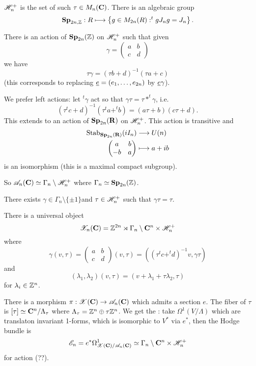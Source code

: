 \begin{definition}
$\mathscr H_n^{+}$ is the set of such $\tau\in M_n(\mathbf{C})$. There is an algebraic group
\[
\Sp_{2n,\Z}:R \mapsto \left\{ g\in M_{2n}(R) : ^{t}gJ_ng = J_n \right\}
.\]
\end{definition}
There is an action of $\mathbf{Sp}_{2n}(\mathbb Z)$ on $\mathscr H_n^{+}$ such that given
\[
\gamma =
\begin{pmatrix} a & b \\ c & d
\end{pmatrix}
\]
we have
\[
\tau \gamma = (\tau b + d)^{-1}(\tau a + c)
\]
(this corresponds to replacing $\underline{e}=(e_1,\dots,e_{2n})$ by $\underline{e}\gamma$).

We prefer left actions: let $^{t}\gamma$ act so that $\gamma\tau = \tau*^{t}\gamma$, i.e.
\[
(\tau^{t}c + d)^{-1}(\tau^{t}a+^{t}b) = (a\tau + b)(c\tau + d)
.\]
This extends to an action of $\mathbf{Sp}_{2n}(\mathbf{R})$ on $\mathscr H_n^{+}$. This action is transitive and
\begin{align*}
\operatorname{Stab}_{\mathbf{Sp}_{2n}(\mathbf{R})}(iI_n) &\longrightarrow U(n) \\
\begin{pmatrix} a & b \\ -b & a
\end{pmatrix}  &\longmapsto a + ib
\end{align*}
is an isomorphism (this is a maximal compact subgroup).

So $\mathscr{A}_n(\mathbf{C})\simeq \Gamma_n\setminus \mathscr H_n^{+}$ where $\Gamma_n\simeq \mathbf{Sp}_{2n}(\mathbb Z)$.
\begin{remark}
There exists $\gamma\in \Gamma_n\setminus \{\pm 1\} $and $\tau\in \mathscr H_n^{+}$ such that
$\gamma\tau=\tau$.
\end{remark}

There is a universal object
\[
\mathscr{X}_n(\mathbf{C}) = \mathbb Z^{2n}\rtimes \Gamma_n\setminus\mathbf{C}^{n}\times \mathscr H_n^{+}
\]
where
\[
\gamma(v,\tau) =
\begin{pmatrix} a & b \\ c & d
\end{pmatrix} (v,\tau) = ((\tau^{t}c+^{t}d)^{-1}v, \gamma\tau)
\]
and
\[
(\lambda_1,\lambda_2)(v,\tau) = (v+\lambda_1+\tau\lambda_2,\tau)
\]
for $\lambda_i\in \mathbb Z^{n}$.

There is a morphism $\pi:\CX(\C)\to \CA_n(\C)$ which admits a section $e$. The fiber of
$\tau$ is $[\tau]\simeq\mathbf{C}^{n} /\Lambda_\tau$ where $\Lambda_\tau = \mathbb Z^{n}\oplus\tau
\mathbb Z^{n}$. We get the : take $\Omega^{1}(V /\Lambda)$ which are
translaton invariant 1-forms, which is isomorphic to $V^{*}$ via $e^{*}$, then the Hodge bundle is
\[
\mathscr{E}_n = e^{*}\Omega^{1}_{\mathscr{X}(\mathbf{C}) / \mathscr{A}_n(\mathbf{C})} \simeq \Gamma_n\setminus\mathbf{C}^{n}\times \mathscr H_n^{+}
\]
for action (??).

